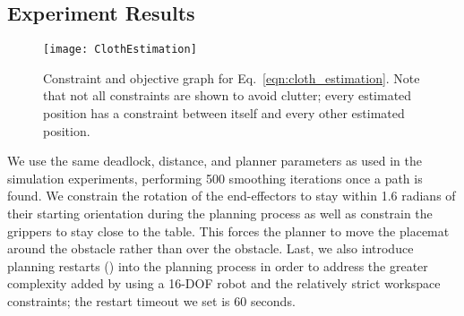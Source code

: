 \subsection{Experiment Results}


\begin{figure}[t]
    \centering
    \texttt{[image: ClothEstimation]}
    \caption{Constraint and objective graph for Eq.~\eqref{eqn:cloth_estimation}. Note that not all constraints are shown to avoid clutter; every estimated position has a constraint between itself and every other estimated position.}
    \label{fig:cloth_estimation}
\end{figure}







We use the same deadlock, distance, and planner parameters as used in the simulation experiments, performing 500 smoothing iterations once a path is found. We constrain the rotation of the end-effectors to stay within 1.6 radians of their starting orientation during the planning process as well as constrain the grippers to stay close to the table. This forces the planner to move the placemat around the obstacle rather than over the obstacle. Last, we also introduce planning restarts (\cite{Wedge2008}) into the planning process in order to address the greater complexity added by using a 16-DOF robot and the relatively strict workspace constraints; the restart timeout we set is 60 seconds.



